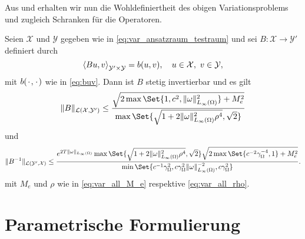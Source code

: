Aus  und  erhalten wir nun die Wohldefiniertheit des obigen Variationsproblems und zugleich Schranken für die Operatoren.

\begin{Korollar}
\label{korollar:2.2}
    Seien $\mathcal X$ und $\mathcal Y$ gegeben wie in \eqref{eq:var_ansatzraum_testraum} und sei $B \colon \mathcal X \to \mathcal Y'$ definiert durch
    \begin{equation}
        \left\langle Bu,v\right\rangle_{\mathcal Y' \times \mathcal Y}  = b(u, v), \quad u \in \mathcal X,~ v \in \mathcal Y,
    \end{equation}
    mit $b({\mkern2mu\cdot\mkern2mu}, {\mkern2mu\cdot\mkern2mu})$ wie in \eqref{eq:buv}.
    Dann ist $B$ stetig invertierbar und es gilt
    \begin{equation}
        \norm{B}_{\mathcal L(\mathcal X, \mathcal Y')}
        \leq
        \frac{\sqrt{2 \max\Set{1, c^{2}, \norm{\omega}_{L_{\infty}(\Omega)}^{2}} + M_{e}^{2}}}{\max\Set{\sqrt{1 + 2 \norm{\omega}_{L_{\infty}(\Omega)}^{2} \rho^{4}}, \sqrt{2} }}
    \end{equation}
    und
    \begin{equation}
        \norm{B^{-1}}_{\mathcal L( \mathcal Y', \mathcal X)}
        \leq \frac{e^{2 T \norm{\omega}_{L_{\infty}(\Omega)}} \max\Set{\sqrt{1 + 2 \norm{\omega}_{L_{\infty}(\Omega)}^{2} \rho^{4}}, \sqrt{2}} \sqrt{2 \max\Set{c^{-2} \gamma_{\Omega}^{-4}, 1} + M_{e}^{2}}}{\min\Set{c^{-1} \gamma_{\Omega}^{2}, c \gamma_{\Omega}^{2} \norm{\omega}_{L_{\infty}(\Omega)}^{-2}, c \gamma_{\Omega}^{2} }}.
    \end{equation}
    mit $M_{e}$ und $\rho$ wie in \eqref{eq:var_all_M_e} respektive \eqref{eq:var_all_rho}.
\end{Korollar}


\section{Parametrische Formulierung} %
\label{sec:parametrische_formulierung}


